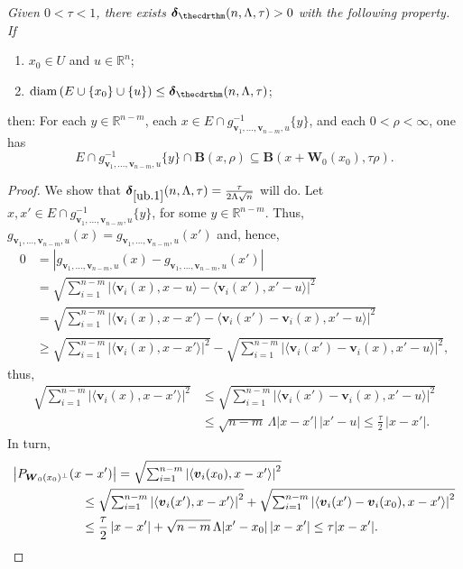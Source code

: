 \documentclass[JEP,XML,SOM,Unicode,ThmDefs,NoEqCountersInSection]{cedram}
\newenvironment{Empty}[2][\null]{%
\begin{enonce}[remark]{#1}#2}
{\end{enonce}}
\newcommand{\R}{\mathbb{R}}
\newcommand{\Rn}{\R^n}
\newcommand{\bdelta}{\boldsymbol{\delta}}
\newcommand{\bB}{{\boldsymbol{B}}}
\newcommand{\bW}{{\boldsymbol{W}}}
\newcommand{\bv}{{\boldsymbol{v}}}
\DeclareMathOperator{\rmdiam}{\mathrm{diam}}
\let\la\langle
\let\ra\rangle
\let\subset\subseteq
\begin{document}
\begin{Empty}[]
\label{ub.1}
{\it
Given $0 < \tau < 1$, there exists $\bdelta_{\thecdrthm}(n,\Lambda,\tau) > 0$ with the following property. If
\begin{enumerate}
\item $x_0 \in U$ and $u \in \Rn$;
\item $\rmdiam\left(E \cup \{x_0\}\cup\{u\}\right) \leq \bdelta_{\thecdrthm}(n,\Lambda,\tau)$;
\end{enumerate}
then: For each $y \in \R^{n-m}$, each $x \in E \cap g_{\bv_1,\ldots,\bv_{n-m},u}^{-1}\{y\}$, and each $0 < \rho < \infty$, one has
\begin{equation*}
E \cap g_{\bv_1,\ldots,\bv_{n-m},u}^{-1}\{y\} \cap \bB(x,\rho) \subset \bB \left(x + \bW_0(x_0),\tau \rho\right).
\end{equation*}
}
\end{Empty}

\begin{proof}
We show that $\bdelta_{\ref{ub.1}}(n,\Lambda,\tau)=\frac{\tau}{2\Lambda \sqrt{n}}$ will do.
Let $x,x' \in E \cap g_{\bv_1,\ldots,\bv_{n-m},u}^{-1}\{y\}$, for some $y \in \R^{n-m}$.
Thus, $g_{\bv_1,\ldots,\bv_{n-m},u}(x)=g_{\bv_1,\ldots,\bv_{n-m},u}(x')$ and, hence,
\begin{align*}
0 &= \left| g_{\bv_1,\ldots,\bv_{n-m},u}(x) - g_{\bv_1,\ldots,\bv_{n-m},u}(x')\right|\\
&= \sqrt{\textstyle\sum_{i=1}^{n-m} \left| \la \bv_i(x),x-u\ra - \la \bv_i(x'),x'-u\ra\right|^2} \\
&= \sqrt{\textstyle\sum_{i=1}^{n-m} \left| \la \bv_i(x),x-x'\ra - \la \bv_i(x') - \bv_i(x),x'-u \ra\right|^2}\\
&\geq \sqrt{\textstyle\sum_{i=1}^{n-m} \left| \la \bv_i(x),x-x'\ra\right|^2} - \sqrt{\textstyle\sum_{i=1}^{n-m}\left| \la \bv_i(x') - \bv_i(x),x'-u \ra\right|^2},
\end{align*}
thus,
\begin{align*}
\sqrt{\textstyle\sum_{i=1}^{n-m} \left| \la \bv_i(x),x-x'\ra\right|^2} &\leq \sqrt{\textstyle\sum_{i=1}^{n-m}\left| \la \bv_i(x') - \bv_i(x),x'-u \ra\right|^2} \\
&\leq \sqrt{n-m}\,\Lambda |x-x'|\,|x'-u| \leq \frac{\tau}{2}\,|x-x'|.
\end{align*}
In turn,
\begin{align*}
\bigl| P_{\bW_0(x_0)^\perp}(x&-x')\bigr| = \sqrt{\textstyle\sum_{i=1}^{n-m}\left|\la \bv_i(x_0),x-x' \ra \right|^2} \\
&\leq \sqrt{\textstyle\sum_{i=1}^{n-m}\left|\la \bv_i(x'),x-x' \ra \right|^2}+\sqrt{\textstyle\sum_{i=1}^{n-m}\left|\la \bv_i(x') - \bv_i(x_0),x-x' \ra \right|^2}\\
&\leq \frac{\tau}{2}\,|x-x'| + \sqrt{n-m}\,\Lambda |x'-x_0|\,|x-x'| \leq \tau |x-x'|.\qedhere
\end{align*}
\end{proof}
\end{document}
